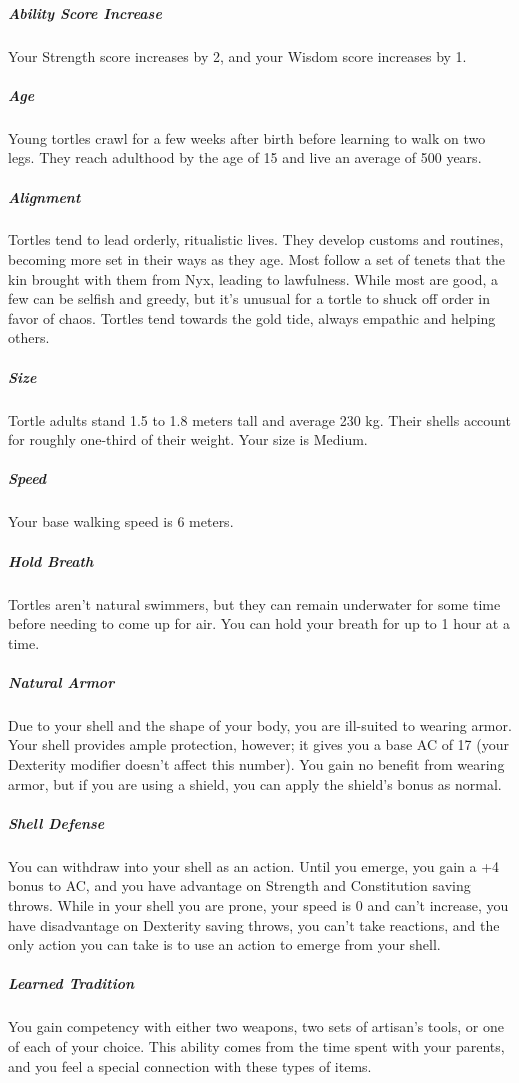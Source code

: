     \subparagraph{Ability Score Increase} Your Strength score increases by 2, and your Wisdom score increases by 1.

    \subparagraph{Age} Young tortles crawl for a few weeks after birth before learning to walk on two legs.
    They reach adulthood by the age of 15 and live an average of 500 years.

    \subparagraph{Alignment} Tortles tend to lead orderly, ritualistic lives.
    They develop customs and routines, becoming more set in their ways as they age.
    Most follow a set of tenets that the kin brought with them from Nyx, leading to lawfulness.
    While most are good, a few can be selfish and greedy, but it's unusual for a tortle to shuck off order in favor of chaos.
    Tortles tend towards the gold tide, always empathic and helping others.

    \subparagraph{Size} Tortle adults stand 1.5 to 1.8 meters tall and average 230 kg.
    Their shells account for roughly one-third of their weight.
    Your size is Medium.

    \subparagraph{Speed} Your base walking speed is 6 meters.

    \subparagraph{Hold Breath} Tortles aren't natural swimmers, but they can remain underwater for some time before needing to come up for air.
    You can hold your breath for up to 1 hour at a time.

    \subparagraph{Natural Armor} Due to your shell and the shape of your body, you are ill-suited to wearing armor.
    Your shell provides ample protection, however; it gives you a base AC of 17 (your Dexterity modifier doesn't affect this number).
    You gain no benefit from wearing armor, but if you are using a shield, you can apply the shield's bonus as normal.

    \subparagraph{Shell Defense} You can withdraw into your shell as an action.
    Until you emerge, you gain a +4 bonus to AC, and you have advantage on Strength and Constitution saving throws.
    While in your shell you are prone, your speed is 0 and can't increase, you have disadvantage on Dexterity saving throws, you can't take reactions, and the only action you can take is to use an action to emerge from your shell.


    \subparagraph{Learned Tradition} You gain competency with either two weapons, two sets of artisan's tools, or one of each of your choice.
    This ability comes from the time spent with your parents, and you feel a special connection with these types of items.

